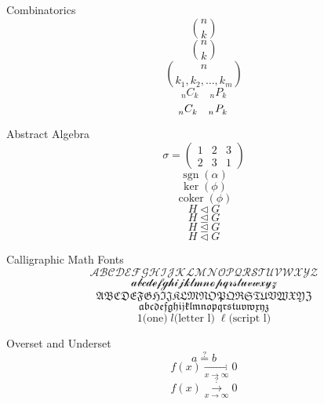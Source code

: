 \documentclass{article}
\begin{document}
    \newpage

    {\Large Combinatorics}
    \[ n \choose k \]
    \[ \binom{n}{k} \]
    \[ \binom{n}{k_1,k_2,\ldots,k_m} \]
    \[ {}_n C_k \quad {}_n P_k \]
    \[ \tensor[_n]{C}{_k} \quad \tensor[_n]{P}{_k} \]
    

    {\Large Abstract Algebra}
    $$\sigma = 
    \begin{pmatrix}
        1 & 2 & 3\\
        2 & 3 & 1
    \end{pmatrix} $$
    \[ \operatorname{sgn}(\alpha)\]
    \[ \ker(\phi) \]
    \[ \operatorname{coker}(\phi) \]
    \[ H \triangleleft G \]
    \[ H \trianglelefteq G \]
    \[ H \unlhd G \]
    \[ H \vartriangleleft G \]

    {\Large Calligraphic Math Fonts}
    \[ \mathcal{A B C D E F G H I J K L M N O P Q R S T U V W X Y Z} \]
    \[ \mathcal{a b c d e f g h i j k l m n o p q r s t u v w x y z} \]
    \[ \mathfrak{A B C D E F G H I J K L M N O P Q R S T U V W X Y Z} \]
    \[ \mathfrak{a b c d e f g h i j k l m n o p q r s t u v w x y z} \]
    \[ 1\text{(one)} \; l\text{(letter l)} \; \ell\text{(script l)}\]

    {\Large Overset and Underset}
    \[ a \overset{?}{=} b \]
    \[ f(x) \underset{x \to \infty}{\longrightarrow} 0 \]
    \[ f(x) \overset{?}{ \underset{x \to \infty}{\longrightarrow} } 0 \]


\end{document}
